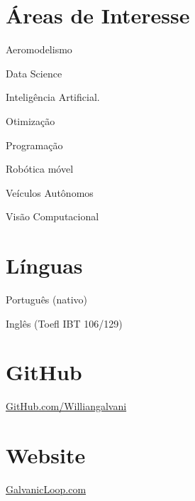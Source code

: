\documentclass[A4]{deedy-resume} %
\begin{document}
\begin{minipage}[t]{0.33\textwidth} %
\section{Áreas de Interesse}
\vspace{\topsep} %
\begin{tightitemize}
\item Aeromodelismo
\item Data Science
\item Inteligência Artificial.
\item Otimização
\item Programação
\item Robótica móvel
\item Veículos Autônomos
\item Visão Computacional
\end{tightitemize}

\section{Línguas}
\vspace{\topsep} %
\begin{tightitemize}
\item Português (nativo)
\item Inglês (Toefl IBT 106/129)
\end{tightitemize}
\section{GitHub}
\href{https://github.com/Williangalvani}{GitHub.com/Williangalvani}

\section{Website}
\href{https://GalvanicLoop.com}{GalvanicLoop.com}


\end{minipage} %
\hfill
\end{document}
